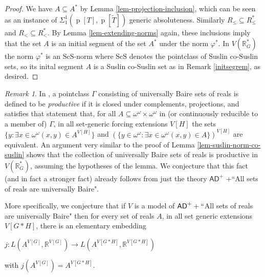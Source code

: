 \documentclass[fleqn, 11pt]{amsart}
\theoremstyle{plain}
\theoremstyle{definition}
\theoremstyle{remark}
\newtheorem{rem}[thm]{Remark} \newtheorem*{rem*}{Remark}
\newcommand{\ScS}{\mathrm{ScS}}
\newcommand{\bbR}{\mathbb{R}}
\newcommand{\AD}{\mathsf{AD}}
\DeclareMathOperator{\p}{p}
\begin{document}
\begin{proof}
 
 
 We have $A \subseteq A^*$ by Lemma \ref{lem-projection-inclusion}, which can be seen as an instance of $\Sigma^1_1(\p[T], \p[\tilde{T}])$ generic absoluteness.
 Similarly $R_\le \subseteq R_\le^*$ and $R_< \subseteq R_<^*$.
 By Lemma \ref{lem-extending-norms} again, these inclusions imply that  the set $A$ is an initial segment of the set $A^*$ under the norm $\varphi^*$.  In $V(\mathbb{R}^*_G)$ the norm $\varphi^*$ is an $\ScS$-norm where $\ScS$ denotes the pointclass of Suslin co-Suslin sets, so its inital segment $A$ is a Suslin co-Suslin set as in Remark \ref{initsegrem}, as desired.
\end{proof}

\begin{rem}
	In \cite{SchindlerYasuda}, a pointclass $\Gamma$
	consisting of universally Baire sets of reals is defined to be \emph{productive} if it is closed under
	complements, projections, and satisfies that statement that, for all $A \subseteq \omega^{\omega} \times \omega^{\omega}$ in (or continuously reducible to a member of) $\Gamma$, in all set-generic forcing extensions $V[H]$ the sets $\{ y : \exists x \in \omega^{\omega} (x,y) \in A^{V[H]} \}$ and 
	$(\{y \in \omega^{\omega} : \exists x \in \omega^{\omega} (x,y) \in A\})^{V[H]}$ are equivalent. An argument very similar to the proof of Lemma \ref{lem-suslin-norm-co-suslin} shows that the collection of universally Baire sets of reals is productive in $V(\bbR^{*}_{G})$, assuming the hypotheses of the lemma. We conjecture that this fact (and in fact a stronger fact) already follows from just the theory $\AD^{+}$ +``All sets of reals are universally Baire". 

    More specifically, we conjecture that if $V$ is a model of $\AD^++``$All sets of reals are universally Baire" then for every set of reals $A$, in all set generic extensions $V[G*H]$, there is an elementary embedding 
    \begin{center} $j: L(A^{V[G]}, \mathbb{R}^{V[G]})\rightarrow L(A^{V[G*H]}, \mathbb{R}^{V[G*H]})$ \end{center}
    with $j(A^{V[G]})=A^{V[G*H]}$.
\end{rem} 
\end{document}
